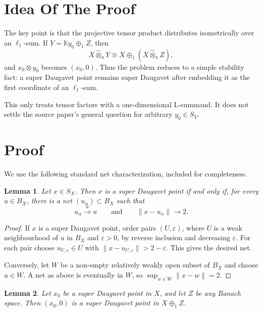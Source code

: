 \documentclass[11pt]{article}
\newtheorem{lemma}{Lemma}
\newcommand{\K}{\mathbb K}
\newcommand{\otpi}{\widehat{\otimes}_{\pi}}
\begin{document}
\section*{Idea Of The Proof}

The key point is that the projective tensor product distributes isometrically
over an \(\ell_1\)-sum.  If \(Y=\K y_0\oplus_1 Z\), then
\[
   X\otpi Y \cong X \oplus_1 (X\otpi Z),
\]
and \(x_0\otimes y_0\) becomes \((x_0,0)\).  Thus the problem reduces to a
simple stability fact: a super Daugavet point remains super Daugavet after
embedding it as the first coordinate of an \(\ell_1\)-sum.

This only treats tensor factors with a one-dimensional L-summand.  It does not
settle the source paper's general question for arbitrary \(y_0\in S_Y\).

\section*{Proof}

We use the following standard net characterization, included for completeness.

\begin{lemma}
\label{lem:net}
Let \(x\in S_X\).  Then \(x\) is a super Daugavet point if and only if, for
every \(u\in B_X\), there is a net \((u_\alpha)\subset B_X\) such that
\[
   u_\alpha \xrightarrow{w} u
   \qquad\text{and}\qquad
   \|x-u_\alpha\|\longrightarrow 2 .
\]
\end{lemma}

\begin{proof}
If \(x\) is a super Daugavet point, order pairs \((U,\varepsilon)\), where
\(U\) is a weak neighbourhood of \(u\) in \(B_X\) and \(\varepsilon>0\), by
reverse inclusion and decreasing \(\varepsilon\).  For each pair choose
\(u_{U,\varepsilon}\in U\) with
\(\|x-u_{U,\varepsilon}\|>2-\varepsilon\).  This gives the desired net.

Conversely, let \(W\) be a non-empty relatively weakly open subset of \(B_X\)
and choose \(u\in W\).  A net as above is eventually in \(W\), so
\(\sup_{w\in W}\|x-w\|=2\).
\end{proof}

\begin{lemma}
\label{lem:l1sum}
Let \(x_0\) be a super Daugavet point in \(X\), and let \(Z\) be any Banach
space.  Then \((x_0,0)\) is a super Daugavet point in \(X\oplus_1 Z\).
\end{lemma}
\end{document}

